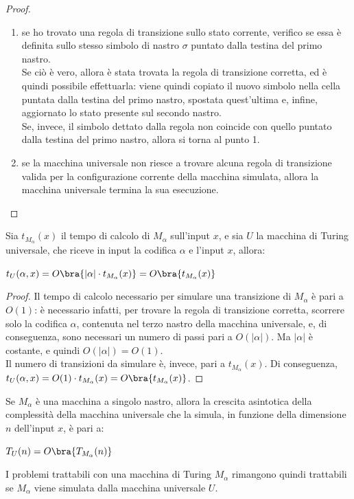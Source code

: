\begin{proof}
\begin{enumerate}
        \item se ho trovato una regola di transizione sullo stato corrente,
        verifico se essa è definita sullo stesso simbolo di nastro $\sigma$
        puntato dalla testina del primo nastro.\\
        Se ciò è vero, allora è stata trovata la regola di transizione
        corretta, ed è quindi possibile effettuarla: viene quindi copiato
        il nuovo simbolo nella cella puntata dalla testina del primo nastro,
        spostata quest'ultima e, infine, aggiornato lo stato presente sul
        secondo nastro.\\
        Se, invece, il simbolo dettato dalla regola non coincide con quello
        puntato dalla testina del primo nastro, allora si torna al punto 1.
        \item se la macchina universale non riesce a trovare alcuna regola di
        transizione valida per la configurazione corrente della macchina
        simulata, allora la macchina universale termina la sua esecuzione.
    \end{enumerate}
\end{proof}

\begin{thm}
    Sia $t_{M_{\alpha}}(x)$ il tempo di calcolo di $M_{\alpha}$ sull'input $x$,
    e sia $U$ la macchina di Turing universale, che riceve in input la codifica
    $\alpha$ e l'input $x$, allora:
    \begin{center}
        $t_U (\alpha, x) = O \bra{|\alpha| \cdot t_{M_{\alpha}}(x)} =
        O \bra{t_{M_{\alpha}}(x)}$
    \end{center}
\end{thm}

\begin{proof}
    Il tempo di calcolo necessario per simulare una transizione di $M_{\alpha}$
    è pari a $O(1)$: è necessario infatti, per trovare la regola di
    transizione corretta, scorrere solo la codifica $\alpha$, contenuta
    nel terzo nastro della macchina universale, e, di conseguenza, sono
    necessari un numero di passi pari a $O(|\alpha|)$. Ma $|\alpha|$ è
    costante, e quindi $O(|\alpha|) = O(1)$.\\
    Il numero di transizioni da simulare è, invece, pari a $t_{M_{\alpha}}(x)$.
    Di conseguenza,
    $t_U(\alpha, x) = O(1) \cdot t_{M_{\alpha}}(x) = O \bra{t_{M_{\alpha}}(x)}$.
\end{proof}

\begin{rem}
    Se $M_{\alpha}$ è una macchina a singolo nastro, allora la crescita
    asintotica della complessità della macchina universale che la simula,
    in funzione della dimensione $n$ dell'input $x$, è pari a:
    \begin{center}
        $T_U(n) = O \bra{T_{M_{\alpha}}(n)}$
    \end{center}
    I problemi trattabili con una macchina di Turing $M_{\alpha}$ rimangono
    quindi trattabili se $M_{\alpha}$ viene simulata dalla macchina
    universale $U$.
\end{rem}

